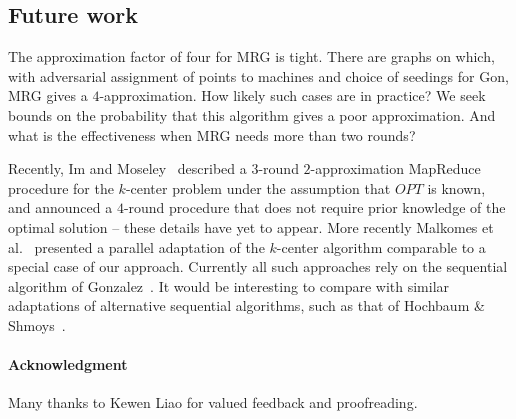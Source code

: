 \documentclass[11pt]{article}
\newcommand{\ours}{{\sc MRG}\xspace}
\newcommand{\gon}{{\sc Gon}\xspace}
\begin{document}
\subsection*{Future work}
The approximation factor of four for \ours is tight.
There are graphs on which,
with adversarial  assignment of points to machines and choice of seedings
for \gon,
 \ours gives a $4$-approximation.
How likely such cases are in practice?
We seek bounds on the probability that this algorithm gives a poor approximation.
And what is the effectiveness when \ours needs more than two rounds?

Recently, Im and Moseley~\cite{im2015} described a
$3$-round $2$-approximation MapReduce procedure for the $k$-center problem
under the assumption that $\mathit{OPT}$ is known, and announced a $4$-round procedure that does not require prior knowledge of the optimal solution -- 
these details have yet to appear.
More recently Malkomes et al.~\cite{malkomes2015fast} presented a parallel adaptation of the $k$-center algorithm comparable to a special case of our approach.
Currently all such approaches rely on the sequential algorithm of Gonzalez~\cite{gonzalez1985clustering}. 
It would be interesting to compare with similar adaptations of alternative sequential algorithms, such as that of Hochbaum \& Shmoys~\cite{hochbaum1985best}.


\vspace{3mm}
\paragraph*{Acknowledgment}
Many thanks to Kewen Liao for valued feedback and proofreading.

\newpage




\end{document}
